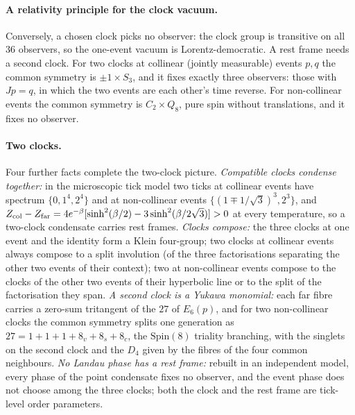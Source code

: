 \paragraph{A relativity principle for the clock vacuum.}
Conversely, a chosen clock picks no observer: the clock group is transitive on all $36$ observers, so the
one-event vacuum is Lorentz-democratic. A rest frame needs a second clock. For two clocks at collinear (jointly
measurable) events $p,q$ the common symmetry is $\pm1\times S_3$, and it fixes exactly three observers: those
with $Jp=q$, in which the two events are each other's time reverse. For non-collinear events the common symmetry
is $C_2\times Q_8$, pure spin without translations, and it fixes no observer. 

\paragraph{Two clocks.}
Four further facts complete the two-clock picture. \emph{Compatible clocks condense together:} in the
microscopic tick model two ticks at collinear events have spectrum $\{0,1^4,2^4\}$ and at non-collinear events
$\{(1\mp1/\sqrt3)^3,2^3\}$, and $Z_{\rm col}-Z_{\rm far}=4e^{-\beta}[\sinh^2(\beta/2)-3\sinh^2(\beta/2\sqrt3)]>0$ at every
temperature, so a two-clock condensate carries rest frames. 
\emph{Clocks compose:} the three clocks at one event and the identity form a Klein four-group; two clocks at
collinear events always compose to a split involution (of the three factorisations separating the other two
events of their context); two at non-collinear events compose to the clocks of the other two events of their
hyperbolic line or to the split of the factorisation they span. 
\emph{A second clock is a Yukawa monomial:} each far fibre carries a zero-sum tritangent of the $27$ of
$E_6(p)$, and for two non-collinear clocks the common symmetry splits one generation as
$27=1+1+1+8_v+8_s+8_c$, the $\mathrm{Spin}(8)$ triality branching, with the singlets on the second clock and the
$D_4$ given by the fibres of the four common neighbours. 
\emph{No Landau phase has a rest frame:} rebuilt in an independent model, every phase of the point
condensate fixes no observer, and the event phase does not choose among the three clocks; both the clock and
the rest frame are tick-level order parameters. 

